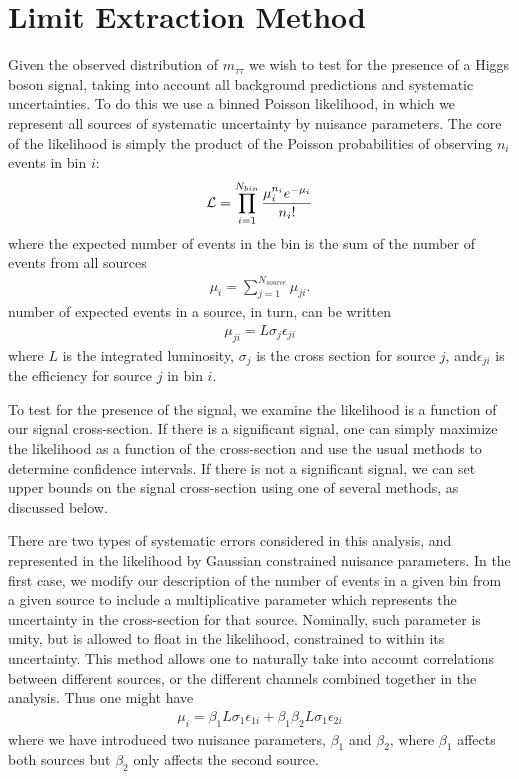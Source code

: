 \section{Limit Extraction Method}
\label{sec:statmethod}
%
Given the observed distribution of $m_{\tau\tau}$ we wish to test for
the presence of a Higgs boson signal, taking into account all
background predictions and systematic uncertainties.  To do this we
use a binned Poisson likelihood, in which we represent all sources of
systematic uncertainty by nuisance parameters.  The core of the
likelihood is simply the product of the Poisson probabilities of
observing $n_i$ events in bin $i$:
\begin{eqnarray}
  {\cal L} = \prod_{i=1}^{N_{bin}} \frac{\mu_i^{n_i} e^{-\mu_i}}{n_i!}
\end{eqnarray}
where the expected number of events in the bin is the sum of the number
of events from all sources
\begin{eqnarray}
  \mu_i = \sum_{j=1}^{N_{source}} \mu_{ji}.
\end{eqnarray}
number of expected events in a source, in turn, can be written
\begin{eqnarray}
  \mu_{ji} = L \sigma_j \epsilon_{ji}
\end{eqnarray}
where $L$ is the integrated luminosity, $\sigma_j$ is the cross section
for source $j$, and$\epsilon_{ji}$ is the efficiency for source $j$ in bin
$i$.  

To test for the presence of the signal, we examine the likelihood is a
function of our signal cross-section.  If there is a significant
signal, one can simply maximize the likelihood as a function of the
cross-section and use the usual methods to determine confidence
intervals. If there is not a significant signal, we can set upper
bounds on the signal cross-section using one of several methods, as
discussed below.

There are two types of systematic errors considered in this analysis,
and represented in the likelihood by Gaussian constrained nuisance
parameters.  In the first case, we modify our description of the
number of events in a given bin from a given source to include a
multiplicative parameter which represents the uncertainty in the
cross-section for that source.  Nominally, such parameter is unity,
but is allowed to float in the likelihood, constrained to within its
uncertainty.  This method allows one to naturally take into account
correlations between different sources, or the different channels
combined together in the analysis. Thus one might have
\begin{eqnarray}
  \mu_i = \beta_1 L \sigma_1 \epsilon_{1i} + \beta_1 \beta_2 L \sigma_1 \epsilon_{2i}
\end{eqnarray}
where we have introduced two nuisance parameters, $\beta_1$ and
$\beta_2$, where $\beta_1$ affects both sources but $\beta_2$ only
affects the second source.

